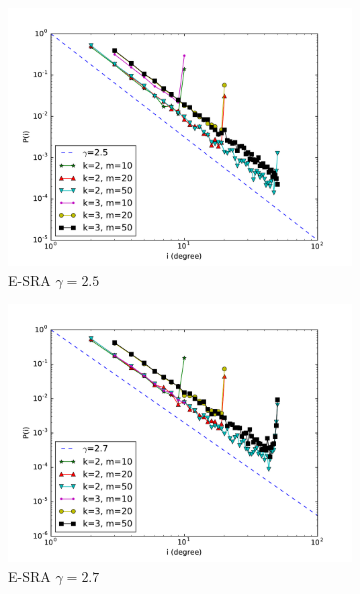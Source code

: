 \begin{figure}[!t]
\centering

\begin{subfigure}{.3\textwidth}
\centering
\includegraphics[width=.99\linewidth]{img/chap2/remove25.pdf}
\caption{E-SRA  $\gamma=2.5$}\label{fig:remove25}
\end{subfigure} 
\begin{subfigure}{.3\textwidth}
\centering
\includegraphics[width=.99\linewidth]{img/chap2/remove27.pdf}
\caption{E-SRA $ \gamma=2.7$}\label{fig:remove27}
\end{subfigure} 
\begin{subfigure}{.3\textwidth}
\centering

\end{subfigure}
\end{figure}

